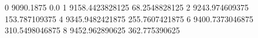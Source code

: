 0 9090.1875 0.0
1 9158.4423828125 68.2548828125
2 9243.974609375 153.787109375
4 9345.9482421875 255.7607421875
6 9400.7373046875 310.5498046875
8 9452.962890625 362.775390625
